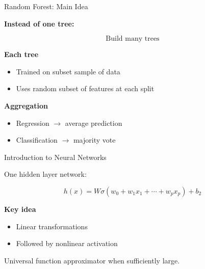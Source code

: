 \documentclass{beamer}
\begin{document}
\begin{frame}{Random Forest: Main Idea}

\textbf{Instead of one tree:}

\[
\text{Build many trees}
\]

\vspace{0.4cm}

\textbf{Each tree}

\begin{itemize}
    \item Trained on subset sample of data
    \item Uses random subset of features at each split
\end{itemize}

\vspace{0.4cm}

\textbf{Aggregation}

\begin{itemize}
    \item Regression $\rightarrow$ average prediction
    \item Classification $\rightarrow$ majority vote
\end{itemize}

\end{frame}
\begin{frame}{Introduction to Neural Networks}

One hidden layer network:

\[
h(x) = W\sigma(w_0+w_1x_1+\cdots + w_px_p)+b_2
\]

\vspace{0.4cm}

\textbf{Key idea}

\begin{itemize}
    \item Linear transformations
    \item Followed by nonlinear activation
\end{itemize}

\vspace{0.3cm}

Universal function approximator when sufficiently large.

\end{frame}
\end{document}
